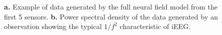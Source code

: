 \documentclass[10pt,a4paper]{article}
\begin{document}
\begin{figure}
   	\begin{center}
    		 \\
   		 \\
   	\end{center}
   	\caption{\textbf{a.} Example of data generated by the full neural field model from the first 5 sensors. \textbf{b.} Power spectral density of the data generated by an observation showing the typical $1/f^2$ characteristic of iEEG.} 
\label{fig:experimental design}
\end{figure}
\end{document}
